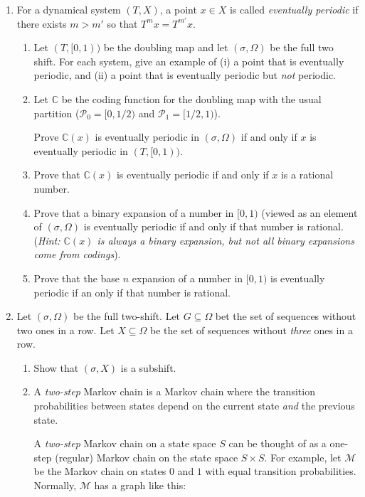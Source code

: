 \documentclass[letter]{article}
\newcommand{\setheader}[6]{
	\lhead{{\sc #1}\\{\sc #2} ({\small \it \today})}
	\rhead{
		{\bf #3} 
		\ifthenelse{\equal{#4}{}}{}{(#4)}\\
		{\bf #5} 
		\ifthenelse{\equal{#6}{}}{}{(#6)}%
	}
}
\newcommand{\C}{\mathbb{C}}
\begin{document}
	\setheader{MAT335}{Homework 4}{Due: 11:59pm April 6}{}{}{}

	\begin{enumerate}
		\item For a dynamical system $(T,X)$, a point $x\in X$ is called \emph{eventually periodic} if there 
			exists $m>m'$ so that $T^mx=T^{m'}x$.
		\begin{enumerate}
			\item Let $(T,[0,1))$ be the doubling map and let $(\sigma,\Omega)$ be the full two shift.
				For each system, give an example of (i) a point that is eventually periodic, and (ii)
				a point that is eventually periodic but \emph{not} periodic.
			\item Let $\C$ be the coding function for the doubling map with the usual partition ($\mathcal P_0=[0,1/2)$
				and $\mathcal P_1=[1/2,1)$).

				Prove $\C(x)$ is eventually periodic in $(\sigma, \Omega)$ if and only if $x$ is eventually
				periodic in $(T,[0,1))$.
			\item Prove that $\C(x)$ is eventually periodic if and only if $x$ is a rational number.
			\item Prove that a binary expansion of a number in $[0,1)$  (viewed as an element of $(\sigma, \Omega)$ 
				is eventually periodic if and only
				if that number is rational. (\emph{Hint: $\C(x)$ is always a binary expansion, but not all
				binary expansions come from codings}).
			\item Prove that the base $n$ expansion of a number in $[0,1)$ is eventually periodic if an only if that
				number is rational.
		\end{enumerate}

		\item Let $(\sigma, \Omega)$ be the full two-shift. Let $G\subseteq\Omega$ 
			bet the set of sequences without two ones in a row.
			Let $X\subseteq \Omega$ be the set of sequences without \emph{three} ones in a row.
			\begin{enumerate}
				\item Show that $(\sigma, X)$ is a subshift.
				\item A \emph{two-step} Markov chain is a Markov chain where the transition probabilities
					between states depend on the current state \emph{and} the previous state. 
					
					A \emph{two-step} Markov chain on a state space $S$ can be thought of as a 
					one-step (regular) Markov chain on the state space $S\times S$. For example, let
					$\mathcal M$ be the Markov
					chain on states $0$ and $1$ with equal transition probabilities.
					Normally, $\mathcal M$ has a graph like this:


\end{enumerate}
\end{enumerate}
\end{document}
